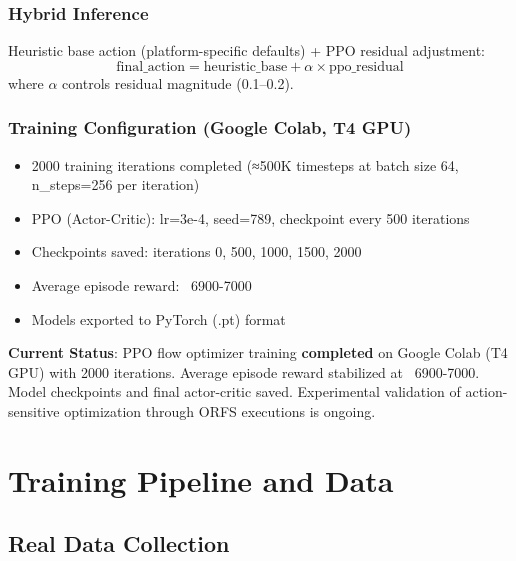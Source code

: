 \documentclass[10pt,conference]{IEEEtran}
\begin{document}
\subsubsection{Hybrid Inference}
Heuristic base action (platform-specific defaults) + PPO residual adjustment:
\begin{equation}
\text{final\_action} = \text{heuristic\_base} + \alpha \times \text{ppo\_residual}
\end{equation}
where $\alpha$ controls residual magnitude (0.1--0.2).

\subsubsection{Training Configuration (Google Colab, T4 GPU)}
\begin{itemize}
    \item 2000 training iterations completed (≈500K timesteps at batch size 64, n\_steps=256 per iteration)
    \item PPO (Actor-Critic): lr=3e-4, seed=789, checkpoint every 500 iterations
    \item Checkpoints saved: iterations 0, 500, 1000, 1500, 2000
    \item Average episode reward: ~6900-7000
    \item Models exported to PyTorch (.pt) format
\end{itemize}

\textbf{Current Status}: PPO flow optimizer training \textbf{completed} on Google Colab (T4 GPU) with 2000 iterations. Average episode reward stabilized at ~6900-7000. Model checkpoints and final actor-critic saved. Experimental validation of action-sensitive optimization through ORFS executions is ongoing.


\section{Training Pipeline and Data}
\label{sec:training_pipeline}

\subsection{Real Data Collection}
\label{sec:data_collection}
\end{document}
